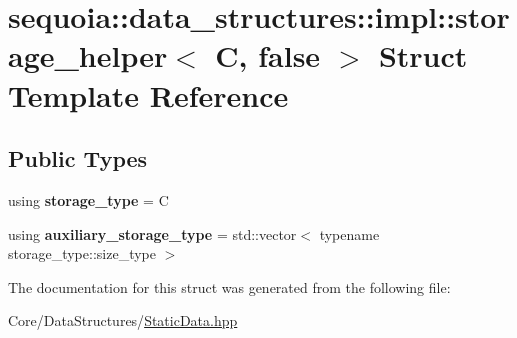 \hypertarget{structsequoia_1_1data__structures_1_1impl_1_1storage__helper_3_01_c_00_01false_01_4}{}\section{sequoia\+::data\+\_\+structures\+::impl\+::storage\+\_\+helper$<$ C, false $>$ Struct Template Reference}
\label{structsequoia_1_1data__structures_1_1impl_1_1storage__helper_3_01_c_00_01false_01_4}
\subsection*{Public Types}
\begin{DoxyCompactItemize}
\item 
\mbox{\label{structsequoia_1_1data__structures_1_1impl_1_1storage__helper_3_01_c_00_01false_01_4_a28fb1157848fd7f665e5f0a7c623e484}} 
using {\bfseries storage\+\_\+type} = C
\item 
\mbox{\label{structsequoia_1_1data__structures_1_1impl_1_1storage__helper_3_01_c_00_01false_01_4_a8659cd5134778cee10bc0e1409f0163a}} 
using {\bfseries auxiliary\+\_\+storage\+\_\+type} = std\+::vector$<$ typename storage\+\_\+type\+::size\+\_\+type $>$
\end{DoxyCompactItemize}


The documentation for this struct was generated from the following file\+:\begin{DoxyCompactItemize}
\item 
Core/\+Data\+Structures/\mbox{\hyperlink{_static_data_8hpp}{Static\+Data.\+hpp}}\end{DoxyCompactItemize}
